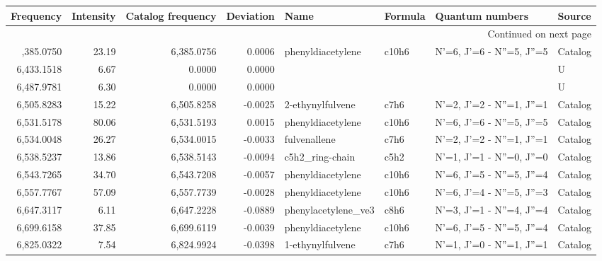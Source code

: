 \begin{longtable}{rrrrllll}
\toprule
  Frequency & Intensity & Catalog frequency & Deviation &                        Name & Formula &                      Quantum numbers &     Source \\
\midrule
\endhead
\midrule
\multicolumn{8}{r}{{Continued on next page}} \\
\midrule
\endfoot

\bottomrule
\endlastfoot
 6,385.0750 &     23.19 &        6,385.0756 &    0.0006 &           phenyldiacetylene &   c10h6 &            N'=6, J'=6 - N''=5, J''=5 &    Catalog \\
 6,433.1518 &      6.67 &            0.0000 &    0.0000 &                             &         &                                      &          U \\
 6,487.9781 &      6.30 &            0.0000 &    0.0000 &                             &         &                                      &          U \\
 6,505.8283 &     15.22 &        6,505.8258 &   -0.0025 &            2-ethynylfulvene &    c7h6 &            N'=2, J'=2 - N''=1, J''=1 &    Catalog \\
 6,531.5178 &     80.06 &        6,531.5193 &    0.0015 &           phenyldiacetylene &   c10h6 &            N'=6, J'=6 - N''=5, J''=5 &    Catalog \\
 6,534.0048 &     26.27 &        6,534.0015 &   -0.0033 &                fulvenallene &    c7h6 &            N'=2, J'=2 - N''=1, J''=1 &    Catalog \\
 6,538.5237 &     13.86 &        6,538.5143 &   -0.0094 &             c5h2_ring-chain &    c5h2 &            N'=1, J'=1 - N''=0, J''=0 &    Catalog \\
 6,543.7265 &     34.70 &        6,543.7208 &   -0.0057 &           phenyldiacetylene &   c10h6 &            N'=6, J'=5 - N''=5, J''=4 &    Catalog \\
 6,557.7767 &     57.09 &        6,557.7739 &   -0.0028 &           phenyldiacetylene &   c10h6 &            N'=6, J'=4 - N''=5, J''=3 &    Catalog \\
 6,647.3117 &      6.11 &        6,647.2228 &   -0.0889 &         phenylacetylene_ve3 &    c8h6 &            N'=3, J'=1 - N''=4, J''=4 &    Catalog \\
 6,699.6158 &     37.85 &        6,699.6119 &   -0.0039 &           phenyldiacetylene &   c10h6 &            N'=6, J'=5 - N''=5, J''=4 &    Catalog \\
 6,825.0322 &      7.54 &        6,824.9924 &   -0.0398 &            1-ethynylfulvene &    c7h6 &            N'=1, J'=0 - N''=1, J''=1 &    Catalog \\

\end{longtable}
